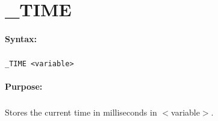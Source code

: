 
\newpage
\section{\_TIME}
\label{cmd:_TIME}

\paragraph{Syntax:}
\subparagraph{}
\texttt{\_TIME <variable>}

\paragraph{Purpose:}
\subparagraph{}
Stores the current time in milliseconds in $<$variable$>$.

